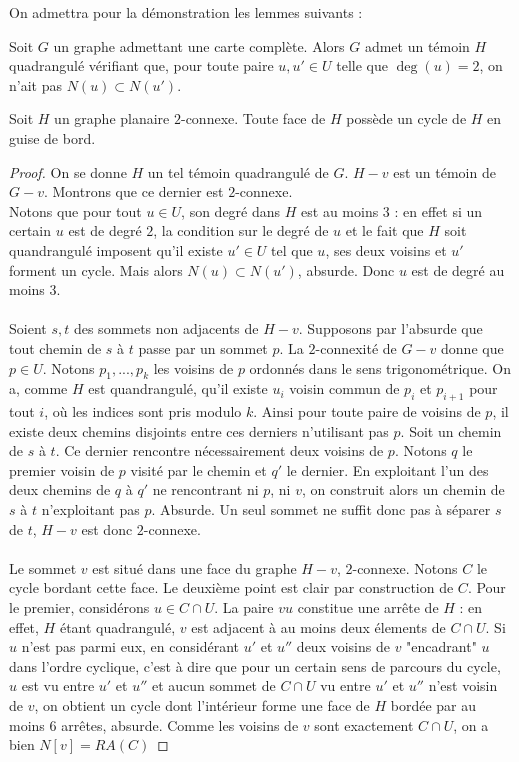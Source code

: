 \documentclass{scrartcl}
\begin{document}
\begin{flushleft}
On admettra pour la démonstration les lemmes suivants :
\begin{lem}
    Soit $G$ un graphe admettant une carte complète. Alors $G$ admet un témoin $H$ quadrangulé vérifiant que, pour toute paire
    $u, u' \in U$ telle que $\deg(u) = 2$, on n'ait pas $N(u) \subset N(u')$.
\end{lem}

\begin{lem}
    Soit $H$ un graphe planaire $2$-connexe. Toute face de $H$ possède un cycle de $H$ en guise de bord.
\end{lem}

\begin{proof}
    On se donne $H$ un tel témoin quadrangulé de $G$. $H-v$ est un témoin de $G-v$. Montrons que ce dernier est $2$-connexe.\\
    Notons que pour tout $u \in U$, son degré dans $H$ est au moins $3$ : en effet si un certain $u$ est de degré $2$,
    la condition sur le degré de $u$ et le fait que $H$ soit quandrangulé imposent qu'il existe $u' \in U$ tel que $u$,
    ses deux voisins et $u'$ forment un cycle. Mais alors $N(u) \subset N(u')$, absurde. Donc $u$ est de degré au moins $3$.
    \\~\\
    Soient $s, t$ des sommets non adjacents de $H-v$. Supposons par l'absurde que tout chemin de $s$ à $t$ passe par un sommet
    $p$. La $2$-connexité de $G-v$ donne que $p \in U$. Notons $p_1, ..., p_k$ les voisins de $p$ ordonnés dans le sens trigonométrique.
    On a, comme $H$ est quandrangulé, qu'il existe $u_i$ voisin commun de $p_i$ et $p_{i+1}$ pour tout $i$, où les indices sont
    pris modulo $k$. Ainsi pour toute paire de voisins de $p$, il existe deux chemins disjoints entre ces derniers n'utilisant pas $p$.
    Soit un chemin de $s$ à $t$. Ce dernier rencontre nécessairement deux voisins de $p$. Notons $q$ le premier voisin de $p$
    visité par le chemin et $q'$ le dernier. En exploitant l'un des deux chemins de $q$ à $q'$ ne rencontrant ni $p$, ni $v$,
    on construit alors un chemin de $s$ à $t$ n'exploitant pas $p$. Absurde. Un seul sommet ne suffit donc pas à séparer $s$ de $t$,
    $H-v$ est donc $2$-connexe.
    \\~\\
    Le sommet $v$ est situé dans une face du graphe $H-v$, $2$-connexe. Notons $C$ le cycle bordant cette face. Le deuxième point
    est clair par construction de $C$. Pour le premier, considérons $u \in C \cap U$. La paire $vu$ constitue une arrête de $H$ :
    en effet, $H$ étant quadrangulé, $v$ est adjacent à au moins deux élements de $C \cap U$. Si $u$ n'est pas parmi eux,
    en considérant $u'$ et $u''$ deux voisins de $v$ "encadrant" $u$ dans l'ordre cyclique, c'est à dire que pour un certain
    sens de parcours du cycle, $u$ est vu entre $u'$ et $u''$ et aucun sommet de $C \cap U$ vu entre $u'$ et $u''$ n'est voisin
    de $v$, on obtient un cycle dont l'intérieur forme une face de $H$ bordée par au moins $6$ arrêtes, absurde. Comme les voisins
    de $v$ sont exactement $C \cap U$, on a bien $N[v] = RA(C)$
\end{proof}


\end{flushleft}
\end{document}
